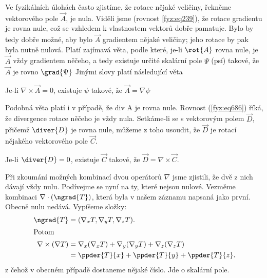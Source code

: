       Ve fyzikálních úlohách často zjistíme, že rotace nějaké veličiny, řekněme vektorového pole 
      \(\vec{A}\), je nula. Viděli jsme (rovnost \ref{fyz:eq239}), že rotace gradientu je rovna 
      nule, což se vzhledem k vlastnostem vektorů dobře pamatuje. Bylo by tedy dobře možné, aby bylo 
      \(\vec{A}\) gradientem nějaké veličiny; jeho rotace by pak byla nutně nulová. Platí zajímavá 
      věta, podle které, je-li \(\rot{A}\) rovna nule, je \(\vec{A}\) vždy gradientem něčeho, a tedy 
      existuje určité skalární pole \(\Psi\) (psí) takové, že \(\vec{A}\) je rovno \(\grad{\Psi}\) 
      Jinými slovy platí následující věta
      \begin{lemma}
        Je-li $\nabla\times\vec{A}=0$, existuje $\psi$ takové, že $\vec{A} = \nabla\psi$
      \end{lemma}
      Podobná věta platí i v případě, že div A je rovna nule. Rovnost (\ref{fyz:eq686}) říká, že
      divergence rotace něčeho je vždy nula. Setkáme-li se s vektorovým polem \(\vec{D}\), přičemž 
      \(\diver{D}\) je rovna nule, můžeme z toho usoudit, že \(\vec{D}\) je rotací nějakého vektorového pole 
      \(\vec{C}\).
      \begin{lemma}
        Je-li $\diver{D} = 0$, existuje $\vec{C}$ takové, že $\vec{D} = \nabla\times\vec{C}$.
      \end{lemma}
      Při zkoumání možných kombinací dvou operátorů \(\nabla\) jsme zjistili, že dvě z nich dávají 
      vždy nulu. Podívejme se nyní na ty, které nejsou nulové. Vezměme kombinaci 
      \(\nabla\cdot(\ngrad{T})\), která byla v našem záznamu napsaná jako první. Obecně nulu nedává. 
      Vypíšeme složky: 
      \begin{align*}
        \ngrad{T}              &= (\nabla_xT, \nabla_yT, \nabla_zT).  \\
        \shortintertext{Potom}
        \nabla\times(\nabla T) &= \nabla_x(\nabla_xT) + \nabla_y(\nabla_yT) + \nabla_z(\nabla_zT)   \\
                                &= \ppder{T}{x} + \ppder{T}{y} + \ppder{T}{z}.
      \end{align*}
      z čehož v obecném případě dostaneme nějaké číslo. Jde o skalární pole. 
    
